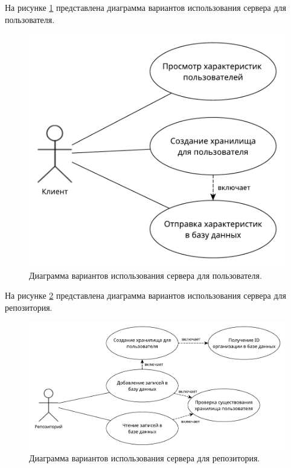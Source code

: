 На рисунке \ref{fig:userUseCase} представлена диаграмма вариантов использования сервера для пользователя.

\begin{figure}[H]
	\centering
	\includegraphics[width=\textwidth]{img/useCaseClient.pdf}
	\caption{Диаграмма вариантов использования сервера для пользователя.}
	\label{fig:userUseCase}
\end{figure}

На рисунке \ref{fig:repositoryUseCase} представлена диаграмма вариантов использования сервера для репозитория.

\begin{figure}[H]
	\centering
	\includegraphics[width=\textwidth]{img/useCaseServer.pdf}
	\caption{Диаграмма вариантов использования сервера для репозитория.}
	\label{fig:repositoryUseCase}
\end{figure}

